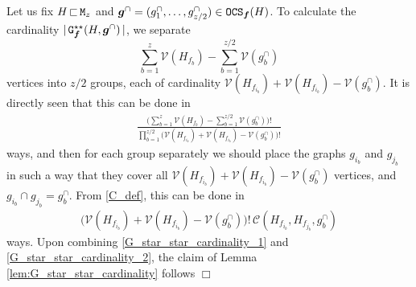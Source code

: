 \documentclass[11pt,reqno]{amsart}
\numberwithin{equation}{section}
\newcommand{\nelem}[1]{{Lemma \ref{#1}}}
\newcommand{\QED}{\hfill $\Box$}
\newcommand{\kb}[1]{\boldsymbol{#1}}
\newcommand{\vk}[1]{\kb{#1}}
\begin{document}
{ Let us fix ${H}{\,\sqsubset\,}{\tt M}_z$ and $\vk g^{\cap} = {(g^{\cap}_1,\ldots, g^{\cap}_{z/2})} \in{\tt OCS}_{\vk f}({H})$. To calculate the cardinality $|\,{\tt G}_{\vk f}^{\star\star}({H},\vk g^{\cap})\,|$, we separate \[\sum_{b=1}^{z}\mathcal{V}({H}_{f_b}) - \sum_{b=1}^{z/2}\mathcal{V}(g_b^{\cap})\] vertices into $z/2$ groups, each of cardinality $\mathcal{V}({H}_{f_{i_b}})+\mathcal{V}({H}_{f_{i_b}})-\mathcal{V}(g^{\cap}_{b})$. It is directly seen that this can be done in
\begin{align}
    \frac{\bigl(\sum_{b=1}^{z}\mathcal{V}({H}_{f_b}) - \sum_{b=1}^{z/2}\mathcal{V}(g_b^{\cap})\bigr)!}{\prod_{b=1}^{z/2}\bigl(\mathcal{V}({H}_{f_{i_b}})+\mathcal{V}({H}_{f_{i_b}})-\mathcal{V}(g^{\cap}_{b})\bigr)!}\label{G_star_star_cardinality_1}
\end{align}
ways, and then for each group separately we should place the graphs $g_{i_b}$ and $g_{j_b}$ in such a way that they cover all $\mathcal{V}({H}_{f_{i_b}})+\mathcal{V}({H}_{f_{i_b}})-\mathcal{V}(g^{\cap}_{b})$ vertices, and $g_{i_b}\cap g_{j_b} = g^{\cap}_b$. From \eqref{C_def}, this can be done in 
\begin{align}
    \bigl(\mathcal{V}({H}_{f_{i_b}})+\mathcal{V}({H}_{f_{i_b}})-\mathcal{V}(g^{\cap}_{b})\bigr)!\,\mathcal{C}({H}_{f_{i_b}},{H}_{f_{j_b}},g^{\cap}_{b})\label{G_star_star_cardinality_2}
\end{align}
ways.
Upon combining \eqref{G_star_star_cardinality_1} and \eqref{G_star_star_cardinality_2}, the claim of \nelem{lem:G_star_star_cardinality} follows
\QED
}
{\small 


}

\medskip
\end{document}
